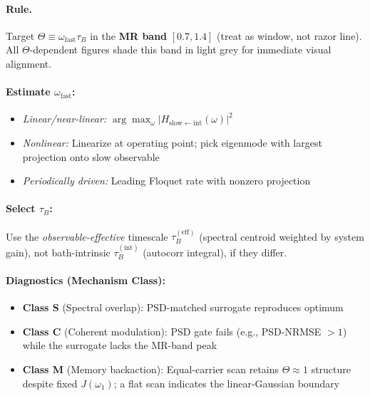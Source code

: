 \documentclass[11pt,letterpaper]{article}
\begin{document}
\begin{tcolorbox}[colback=blue!5!white,colframe=blue!75!black,title=Design Card: Memory-Resonance Condition ($\Theta \approx 1$)]

\paragraph*{Rule.} Target $\Theta \equiv \omega_{\mathrm{fast}} \tau_B$ in the \textbf{MR band} $[0.7, 1.4]$ (treat as window, not razor line). All $\Theta$-dependent figures shade this band in light grey for immediate visual alignment.

\paragraph*{Estimate $\omega_{\mathrm{fast}}$:}
\begin{itemize}[nosep,leftmargin=*]
\item \emph{Linear/near-linear:} $\arg\max_\omega |H_{\mathrm{slow}\leftarrow\mathrm{int}}(\omega)|^2$
\item \emph{Nonlinear:} Linearize at operating point; pick eigenmode with largest projection onto slow observable
\item \emph{Periodically driven:} Leading Floquet rate with nonzero projection
\end{itemize}

\paragraph*{Select $\tau_B$:}
Use the \emph{observable-effective} timescale $\tau_B^{(\mathrm{eff})}$ (spectral centroid weighted by system gain), not bath-intrinsic $\tau_B^{(\mathrm{int})}$ (autocorr integral), if they differ.

\paragraph*{Diagnostics (Mechanism Class):}
\begin{itemize}[nosep,leftmargin=*]
\item \textbf{Class S} (Spectral overlap): PSD-matched surrogate reproduces optimum
\item \textbf{Class C} (Coherent modulation): PSD gate fails (e.g., PSD-NRMSE $>1$) while the surrogate lacks the MR-band peak
\item \textbf{Class M} (Memory backaction): Equal-carrier scan retains $\Theta\!\approx\!1$ structure despite fixed $J(\omega_1)$; a flat scan indicates the linear-Gaussian boundary
\end{itemize}


\end{tcolorbox}
\end{document}
